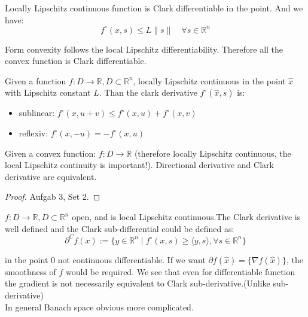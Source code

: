 \begin{theorem}
Locally Lipschitz continuous function is Clark differentiable in the point. And we have:
\begin{equation*}
	f^\circ(x, s) \leq L \| s \| \quad \forall s \in \mathbb{R}^n
\end{equation*}
\end{theorem}

Form convexity follows the local Lipschitz differentiability. Therefore all the convex function is Clark differentiable.

\begin{lemma}
	Given a function $f: D \longrightarrow \mathbb{R}, D \subset \mathbb{R}^n$, locally Lipschitz continuous in the point $\hat{x}$ with Lipschitz constant $L$. Than the clark derivative $f^\circ(\hat{x}, s) $ is:
	\begin{itemize}
		\item sublinear: $f^\circ(x, u + v) \leq f^\circ(x, u) + f^\circ(x, v)$
		\item reflexiv: $f^\circ(x, -u) = -f^\circ(x, u)$
	\end{itemize}
\end{lemma}

\begin{theorem}
	Given a convex function: $f: D \longrightarrow \mathbb{R}$ (therefore locally Lipschitz continuous, the local Lipschitz continuity is important!). Directional derivative and Clark derivative are equivalent. 
\end{theorem}

\begin{proof}
	Aufgab 3, Set 2.
\end{proof}


\begin{definition}
	$f: D \longrightarrow \mathbb{R}, D \subset \mathbb{R}^n$ open, and is local Lipschitz continuous.The Clark derivative is well defined and the Clark sub-differential could be defined as:
	\begin{equation*}
		\partial^C f(x) := \{ y \in \mathbb{R}^n \mid f^\circ(x,s) \geq \langle y,s \rangle , \forall s \in \mathbb{R}^n \}
	\end{equation*}
\end{definition}
\begin{example}
	in the point 0 not continuous differentiable. If we want $\partial f(\hat{x}) = \{\nabla f(\hat{x}) \}$, the smoothness of $f$ would be required. We see that even for differentiable function the gradient is not necessarily equivalent to Clark sub-derivative.(Unlike sub-derivative)\\
	In general Banach space obvious more complicated. 
\end{example}

